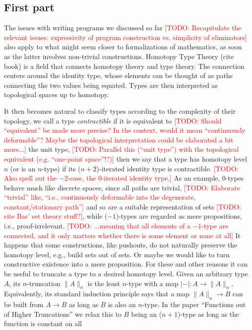 \documentclass{book}
\newcommand{\TODO}[1]{\textcolor{red}{[TODO: #1]}}
\newcommand{\tr}[2]{\| #2 \|_{#1}}
\newcommand{\trcon}[1]{| #1 |}
\begin{document}
\subsection{First part}
The issues with writing programs we discussed so far
\TODO{Recapitulate the relevant issues: expressivity of program construction vs. simplicity of eliminators}
also apply to
what might seem closer to formalizations of mathematics, as soon as the
latter involves non-trivial constructions.
Homotopy Type Theory (cite book) is a field that connects homotopy theory and type theory.
The connection centers around the identity type, whose elements can be
thought of as paths connecting the two values being equated. Types are
then interpreted as topological spaces up to homotopy.

It then becomes natural to classify types according to the complexity
of their topology, we call a type \emph{contractible} if it is
equivalent to \TODO{Should ``equivalent'' be made more precise?  In
  the context, would it mean ``continuously deformable''?  Maybe the
  topological interpretation could be elaborated a bit more...}
the unit type, \TODO{Parallel this (``unit type'') with the
  topological equivalent (e.g. ``one-point space''!?)}
then we say that a type has homotopy level $n$ (or is an
$n$-type) if its ($n{+}2$)-iterated identity type is contractible.
\TODO{Also spell out the $-2$-case, the $0$-iterated identity type.}
As an example,
$0$-types behave much like discrete spaces, since all paths are
trivial, \TODO{Elaborate ``trivial'' like, ``i.e., continuously
  deformable into the degenerate, constant/stationary path''}
and so are a suitable representation of sets \TODO{cite Bas' set theory stuff?},
while ($-1$)-types are regarded as mere propositions, i.e.,
proof-irrelevant. \TODO{...meaning that all elements of a $-1$-type are
  connected, and it only matters whether there is some element or none
  at all}
It happens that some constructions, like pushouts, do not naturally
preserve the homotopy level, e.g., build sets out of sets.  Or maybe we
would like to turn constructive existence into a mere proposition.  For
these and other reasons it can be useful to truncate a type to a
desired homotopy level.
Given an arbitrary type $A$, its $n$-truncation $\tr{n}{A}$ is the least
$n$-type with a map $\trcon{{-}} : A \to \tr{n}{A}$.  Equivalently, its standard
induction principle says that a map $\tr{n}{A} \to B$ can be built
from $A \to B$ as long as $B$ is also an $n$-type.
In the paper ``Functions out of Higher Truncations'' we relax this to
$B$ being an ($n{+}1$)-type as long as the function is constant on all
\end{document}
